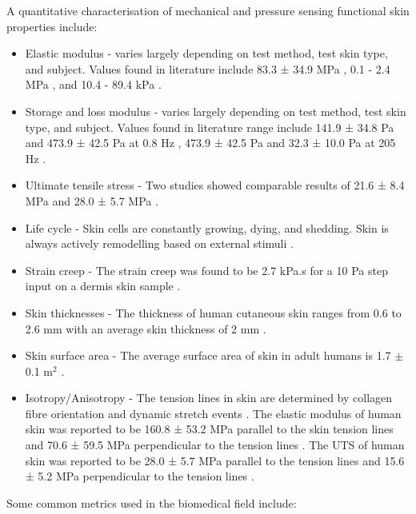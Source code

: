 A quantitative characterisation of mechanical and pressure sensing functional skin properties include:
\begin{itemize}
    \item Elastic modulus -  varies largely depending on test method, test skin type, and subject. Values found in literature include 83.3 ± 34.9 MPa \cite{Annaidh2012}, 0.1 - 2.4 MPa \cite{Khaothong2010}, and 10.4 - 89.4 kPa \cite{Zheng1999}.
    \item Storage and loss modulus - varies largely depending on test method, test skin type, and subject. Values found in literature range include 141.9 ± 34.8 Pa and 473.9 ± 42.5 Pa at 0.8 Hz \cite{Holt2008}, 473.9 ± 42.5 Pa and 32.3 ± 10.0 Pa at 205 Hz \cite{Parvini2022}.
    \item Ultimate tensile stress - Two studies showed comparable results of 21.6 ± 8.4 MPa \cite{Annaidh2012} and 28.0 ± 5.7 MPa \cite{Ottenio2015}.
    \item Life cycle - Skin cells are constantly growing, dying, and shedding. Skin is always actively remodelling based on external stimuli \cite{McGrath2010}.
    \item Strain creep - The strain creep was found to be 2.7 kPa.s for a 10 Pa step input on a dermis skin sample \cite{Holt2008}.
    \item Skin thicknesses - The thickness of human cutaneous skin ranges from 0.6 to 2.6 mm with an average skin thickness of 2 mm \cite{Landry2021}.
    \item Skin surface area - The average surface area of skin in adult humans is 1.7 $\pm$ 0.1 m$^2$ \cite{Landry2021}.
    \item Isotropy/Anisotropy - The tension lines in skin are determined by collagen fibre orientation and dynamic stretch events \cite{Paul2018}. The elastic modulus of human skin was reported to be 160.8 ± 53.2 MPa parallel to the skin tension lines and 70.6 ± 59.5 MPa perpendicular to the tension lines \cite{Ottenio2015}. The UTS of human skin was reported to be 28.0 ± 5.7 MPa parallel to the tension lines and 15.6 ± 5.2 MPa perpendicular to the tension lines \cite{Ottenio2015}.    
\end{itemize}
Some common metrics used in the biomedical field include:

